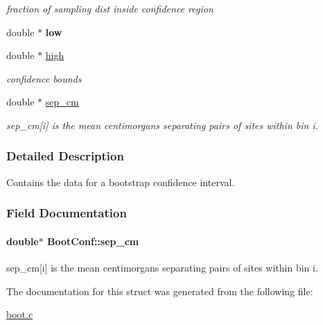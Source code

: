 \begin{DoxyCompactItemize}
\begin{DoxyCompactList}\small\item\em fraction of sampling dist inside confidence region \end{DoxyCompactList}\item 
\hypertarget{struct_boot_conf_aed2ad2c316f488f9d44879571db8cd43}{double $\ast$ {\bfseries low}}\label{struct_boot_conf_aed2ad2c316f488f9d44879571db8cd43}

\item 
\hypertarget{struct_boot_conf_a0daa885809da2a6e7599bced779127d9}{double $\ast$ \hyperlink{struct_boot_conf_a0daa885809da2a6e7599bced779127d9}{high}}\label{struct_boot_conf_a0daa885809da2a6e7599bced779127d9}

\begin{DoxyCompactList}\small\item\em confidence bounds \end{DoxyCompactList}\item 
double $\ast$ \hyperlink{struct_boot_conf_a9c77f42dd63b54e4c46fe697982d63ef}{sep\+\_\+cm}
\begin{DoxyCompactList}\small\item\em sep\+\_\+cm\mbox{[}i\mbox{]} is the mean centimorgans separating pairs of sites within bin i. \end{DoxyCompactList}\end{DoxyCompactItemize}


\subsubsection{Detailed Description}
Contains the data for a bootstrap confidence interval. 



\subsubsection{Field Documentation}
\hypertarget{struct_boot_conf_a9c77f42dd63b54e4c46fe697982d63ef}{
\paragraph[{sep\+\_\+cm}]{\setlength{\rightskip}{0pt plus 5cm}double$\ast$ Boot\+Conf\+::sep\+\_\+cm}}\label{struct_boot_conf_a9c77f42dd63b54e4c46fe697982d63ef}


sep\+\_\+cm\mbox{[}i\mbox{]} is the mean centimorgans separating pairs of sites within bin i. 



The documentation for this struct was generated from the following file\+:\begin{DoxyCompactItemize}
\item 
\hyperlink{boot_8c}{boot.\+c}\end{DoxyCompactItemize}
